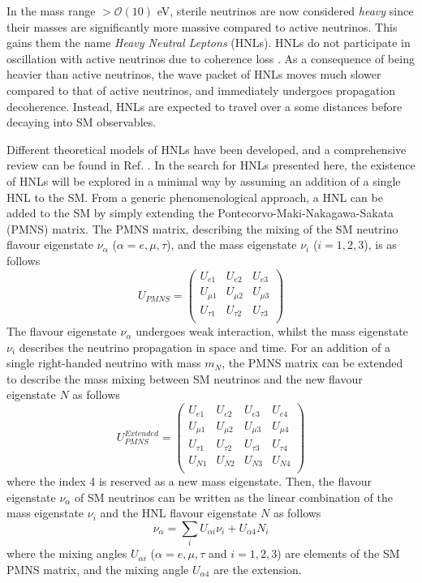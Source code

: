 In the mass range $> \mathcal{O}(10)$ eV, sterile neutrinos are now considered \textit{heavy} since their masses are significantly more massive compared to active neutrinos.
This gains them the name \textit{Heavy Neutral Leptons} (HNLs).
HNLs do not participate in oscillation with active neutrinos due to coherence loss \cite{SBNHNL}.
As a consequence of being heavier than active neutrinos, the wave packet of HNLs moves much slower compared to that of active neutrinos, and immediately undergoes propagation decoherence.
Instead, HNLs are expected to travel over a some distances before decaying into SM observables.

Different theoretical models of HNLs have been developed, and a comprehensive review can be found in Ref. \cite{HNLWhitePaper}. 
In the search for HNLs presented here, the existence of HNLs will be explored in a minimal way by assuming an addition of a single HNL to the SM.  
From a generic phenomenological approach, a HNL can be added to the SM by simply extending the Pontecorvo-Maki-Nakagawa-Sakata (PMNS) matrix.
The PMNS matrix, describing the mixing of the SM neutrino flavour eigenstate $\nu_{\alpha}$ ($\alpha=e,\mu,\tau$), and the mass eigenstate $\nu_{i}$ ($i=1,2,3$), is as follows 
\begin{equation}
	U_{PMNS} =
	\begin{pmatrix}
		U_{e1} & U_{e2} & U_{e3}\\
		U_{\mu1} & U_{\mu2} & U_{\mu3}\\
		U_{\tau1} & U_{\tau2} & U_{\tau3}\\
	\end{pmatrix}
\end{equation}
The flavour eigenstate $\nu_{\alpha}$ undergoes weak interaction, whilst the mass eigenstate $\nu_{i}$ describes the neutrino propagation in space and time.
For an addition of a single right-handed neutrino with mass $m_{N}$, the PMNS matrix can be extended to describe the mass mixing between SM neutrinos and the new flavour eigenstate $N$ as follows 
\begin{equation}
	U_{PMNS}^{Extended} =
	\begin{pmatrix}
		U_{e1} & U_{e2} & U_{e3} & U_{e4}\\
		U_{\mu1} & U_{\mu2} & U_{\mu3} & U_{\mu4}\\
		U_{\tau1} & U_{\tau2} & U_{\tau3} & U_{\tau4}\\
		U_{N1} & U_{N2} & U_{N3} & U_{N4}\\
	\end{pmatrix}
\end{equation}
where the index 4 is reserved as a new mass eigenstate.
Then, the flavour eigenstate  $\nu_{\alpha}$ of SM neutrinos can be written as the linear combination of the mass eigenstate $\nu_{i}$ and the HNL flavour eigenstate $N$ as follows 
\begin{equation}
	\nu_{\alpha}=\sum_i U_{\alpha i}\nu_{i} + U_{\alpha 4}N
_i\end{equation}
where the mixing angles $U_{\alpha i }$ ($\alpha=e,\mu,\tau$ and $i=1,2,3$) are elements of the SM PMNS matrix, and the mixing angle $U_{\alpha 4}$ are the extension.

